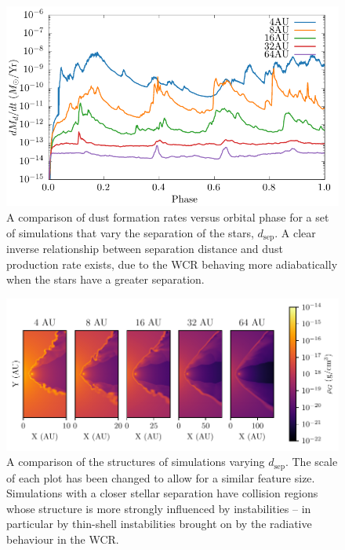 \begin{figure}
  \centering
  \includegraphics{assets/dsep-phase-dust_rate.pdf}
  \caption[Dust formation rate versus binary separation distance]{A comparison of dust formation rates versus orbital phase for a set of simulations that vary the separation of the stars, $d_\text{sep}$. A clear inverse relationship between separation distance and dust production rate exists, due to the WCR behaving more adiabatically when the stars have a greater separation.}
  \label{fig:dsepdustproduction}
\end{figure}

\begin{figure}
  \centering
  \includegraphics{assets/adiabatic-flow/instab-comp-rho.pdf}
  \caption[A comparison of the structures of simulations varying $d_\text{sep}$]{A comparison of the structures of simulations varying $d_\text{sep}$. The scale of each plot has been changed to allow for a similar feature size. Simulations with a closer stellar separation have collision regions whose structure is more strongly influenced by instabilities -- in particular by thin-shell instabilities brought on by the radiative behaviour in the WCR.}
  \label{fig:dsepinstabilities}
\end{figure}

